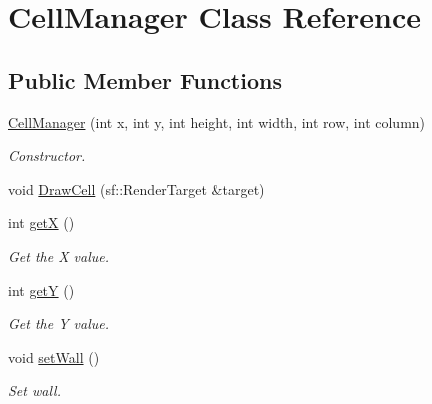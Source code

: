 \hypertarget{class_cell_manager}{}\section{Cell\+Manager Class Reference}
\label{class_cell_manager}
\subsection*{Public Member Functions}
\begin{DoxyCompactItemize}
\item 
\mbox{\hyperlink{class_cell_manager_aa0f293fc17a96f4622e5f9d3bec0928f}{Cell\+Manager}} (int x, int y, int height, int width, int row, int column)
\begin{DoxyCompactList}\small\item\em Constructor. \end{DoxyCompactList}\item 
void \mbox{\hyperlink{class_cell_manager_a5483d8656d8ef20de0b88c3fdaa44b4c}{Draw\+Cell}} (sf\+::\+Render\+Target \&target)
\item 
\mbox{\label{class_cell_manager_a5bd4479c2fe3b57f61c365578c34aa59}} 
int \mbox{\hyperlink{class_cell_manager_a5bd4479c2fe3b57f61c365578c34aa59}{getX}} ()
\begin{DoxyCompactList}\small\item\em Get the X value. \end{DoxyCompactList}\item 
\mbox{\label{class_cell_manager_a21092ba64a338efd69139ab413451acb}} 
int \mbox{\hyperlink{class_cell_manager_a21092ba64a338efd69139ab413451acb}{getY}} ()
\begin{DoxyCompactList}\small\item\em Get the Y value. \end{DoxyCompactList}\item 
\mbox{\label{class_cell_manager_a9ccf04ba5e359690d85b6a3d309f00b1}} 
void \mbox{\hyperlink{class_cell_manager_a9ccf04ba5e359690d85b6a3d309f00b1}{set\+Wall}} ()
\begin{DoxyCompactList}\small\item\em Set wall. \end{DoxyCompactList}\item 
\mbox{\label{class_cell_manager_af8df05e6720c3a35b68ee8ace9494810}} 

\end{DoxyCompactItemize}
